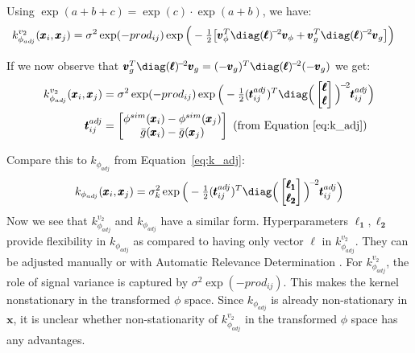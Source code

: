 Using $\exp(a+b+c)=\exp(c) \cdot \exp(a+b)$,  we have:
\begin{align*}
k^{v_2}_{\phi_{adj}}(\pmb{x}_i, \pmb{x}_j) &= \sigma^2 \exp(-prod_{ij}) \exp\Big(- \tfrac{1}{2} \big[ \pmb{v}_{\phi}^T \diag(\pmb{\ell})^{\!-\!2} \pmb{v}_{\phi} + \pmb{v}_{g}^T\diag(\pmb{\ell})^{\!-\!2} \pmb{v}_{g} \big] \Big)
\end{align*}

If we now observe that $\pmb{v}_{g}^T\diag(\pmb{\ell})^{\!-\!2} \pmb{v}_{g} = (-\pmb{v}_{g})^T\diag(\pmb{\ell})^{\!-\!2} (-\pmb{v}_{g})$ we get:
\begin{align*}
k^{v_2}_{\phi_{adj}}(\pmb{x}_i, \pmb{x}_j) 
&= \sigma^2 \exp(-prod_{ij}) \exp\Big(- \tfrac{1}{2} (\pmb{t}_{ij}^{adj})^T \diag\Big(\begin{bmatrix}\pmb{\ell} \\ \pmb{\ell} \end{bmatrix} \Big)^{\!-\!2} \pmb{t}_{ij}^{adj} \Big) \\
\pmb{t}_{ij}^{adj} &= 
\begin{bmatrix}
\phi^{sim}(\pmb{x}_{i}) - \phi^{sim}(\pmb{x}_{j}) \\
\bar{g}(\pmb{x}_i) - \bar{g}(\pmb{x}_j)
\end{bmatrix} \text{ (from Equation~\ref{eq:k_adj})}
\end{align*}

Compare this to $k_{\phi_{adj}}$ from Equation~\ref{eq:k_adj}:
\begin{equation}
k_{\phi_{adj}}(\pmb{x}_i, \pmb{x}_j) = \sigma_k^2 \exp\Big(- \tfrac{1}{2} (\pmb{t}_{ij}^{adj})^T \diag\Big(\begin{bmatrix}\pmb{\ell_1} \\ \pmb{\ell_2} \end{bmatrix}\Big)^{\!-\!2} \pmb{t}_{ij}^{adj} \Big)
\end{equation}
Now we see that $k^{v_2}_{\phi_{adj}}$ and $k_{\phi_{adj}}$ have a similar form. Hyperparameters $\pmb{\ell_1}, \pmb{\ell_2}$ provide flexibility in $k_{\phi_{adj}}$ as compared to having only vector $\pmb{\ell}$ in $k^{v_2}_{\phi_{adj}}$. They can be adjusted manually or with Automatic Relevance Determination \citep{GPsMLBook}. 
For $k^{v_2}_{\phi_{adj}}$, the role of signal variance is captured by $\sigma^2 \exp(-prod_{ij})$. This makes the kernel nonstationary in the transformed $\phi$ space. 
Since $k_{\phi_{adj}}$ is already non-stationary in $\pmb{x}$, it is  unclear whether non-stationarity of $k^{v_2}_{\phi_{adj}}$ in the transformed $\phi$ space has any advantages.


